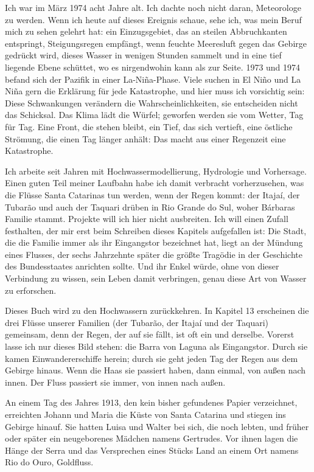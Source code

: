 \documentclass[
  ngerman,
  11pt,
  openany]{book}
\begin{document}
Ich war im März 1974 acht Jahre alt. Ich dachte noch nicht daran,
Meteorologe zu werden. Wenn ich heute auf dieses Ereignis schaue, sehe
ich, was mein Beruf mich zu sehen gelehrt hat: ein Einzugsgebiet, das an
steilen Abbruchkanten entspringt, Steigungsregen empfängt, wenn feuchte
Meeresluft gegen das Gebirge gedrückt wird, dieses Wasser in wenigen
Stunden sammelt und in eine tief liegende Ebene schüttet, wo es
nirgendwohin kann als zur Seite. 1973 und 1974 befand sich der Pazifik
in einer La-Niña-Phase. Viele suchen in El Niño und La Niña gern die
Erklärung für jede Katastrophe, und hier muss ich vorsichtig sein: Diese
Schwankungen verändern die Wahrscheinlichkeiten, sie entscheiden nicht
das Schicksal. Das Klima lädt die Würfel; geworfen werden sie vom
Wetter, Tag für Tag. Eine Front, die stehen bleibt, ein Tief, das sich
vertieft, eine östliche Strömung, die einen Tag länger anhält: Das macht
aus einer Regenzeit eine Katastrophe.

Ich arbeite seit Jahren mit Hochwassermodellierung, Hydrologie und
Vorhersage. Einen guten Teil meiner Laufbahn habe ich damit verbracht
vorherzusehen, was die Flüsse Santa Catarinas tun werden, wenn der Regen
kommt: der Itajaí, der Tubarão und auch der Taquari drüben in Rio Grande
do Sul, woher Bárbaras Familie stammt. Projekte will ich hier nicht
ausbreiten. Ich will einen Zufall festhalten, der mir erst beim
Schreiben dieses Kapitels aufgefallen ist: Die Stadt, die die Familie
immer als ihr Eingangstor bezeichnet hat, liegt an der Mündung eines
Flusses, der sechs Jahrzehnte später die größte Tragödie in der
Geschichte des Bundesstaates anrichten sollte. Und ihr Enkel würde, ohne
von dieser Verbindung zu wissen, sein Leben damit verbringen, genau
diese Art von Wasser zu erforschen.

Dieses Buch wird zu den Hochwassern zurückkehren. In Kapitel 13
erscheinen die drei Flüsse unserer Familien (der Tubarão, der Itajaí und
der Taquari) gemeinsam, denn der Regen, der auf sie fällt, ist oft ein
und derselbe. Vorerst lasse ich nur dieses Bild stehen: die Barra von
Laguna als Eingangstor. Durch sie kamen Einwandererschiffe herein; durch
sie geht jeden Tag der Regen aus dem Gebirge hinaus. Wenn die Haas sie
passiert haben, dann einmal, von außen nach innen. Der Fluss passiert
sie immer, von innen nach außen.

An einem Tag des Jahres 1913, den kein bisher gefundenes Papier
verzeichnet, erreichten Johann und Maria die Küste von Santa Catarina
und stiegen ins Gebirge hinauf. Sie hatten Luisa und Walter bei sich,
die noch lebten, und früher oder später ein neugeborenes Mädchen namens
Gertrudes. Vor ihnen lagen die Hänge der Serra und das Versprechen eines
Stücks Land an einem Ort namens Rio do Ouro, Goldfluss.
\end{document}

